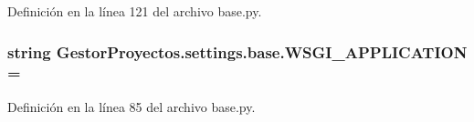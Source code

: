 Definición en la línea 121 del archivo base.\+py.

\subsubsection[{\texorpdfstring{W\+S\+G\+I\+\_\+\+A\+P\+P\+L\+I\+C\+A\+T\+I\+ON}{WSGI_APPLICATION}}]{\setlength{\rightskip}{0pt plus 5cm}string Gestor\+Proyectos.\+settings.\+base.\+W\+S\+G\+I\+\_\+\+A\+P\+P\+L\+I\+C\+A\+T\+I\+ON = \textquotesingle{}}\hypertarget{namespace_gestor_proyectos_1_1settings_1_1base_a11cf6c181d205a12f0e1300a4542e586}{}\label{namespace_gestor_proyectos_1_1settings_1_1base_a11cf6c181d205a12f0e1300a4542e586}


Definición en la línea 85 del archivo base.\+py.

